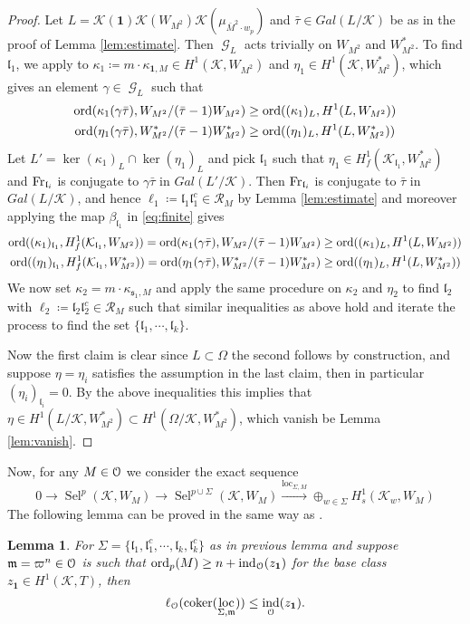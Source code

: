 \documentclass[leqno]{amsart}
\newtheorem{lem}[thm]{Lemma}
\theoremstyle{definition}
\theoremstyle{remark}
\newcommand{\id}{\mathbf{1}}
\newcommand{\eo}{\EuScript{O}}
\DeclareMathOperator{\coker}{coker}
\DeclareMathOperator{\ind}{ind} %
\DeclareMathOperator{\Gal}{\mathcal{G}}
\newcommand{\Fr}{\textnormal{Fr}} %
\newcommand{\fl}{\mathfrak{l}}
\newcommand{\fm}{\mathfrak{m}}
\newcommand{\fs}{\mathfrak{s}}
\newcommand{\K}{{\mathcal{K}}} %
\newcommand{\ord}{\textnormal{ord}} %
\DeclareMathOperator{\loc}{loc}
\DeclareMathOperator{\Sel}{Sel}
\begin{document}
\begin{proof}
Let $L=\K(\id)\K(W_{M^2})\K(\mu_{\bar{M}^2\cdot w_p})$
and $\bar{\tau}\in Gal(L/\K)$ be as in the proof of Lemma \ref{lem:estimate}.
Then $\Gal_L$ acts trivially on $W_{M^2}$ and $W_{M^2}^*$.
To find $\fl_1$, we apply \cite[Lem 5.2.1]{Rubin}
to $\kappa_1\coloneqq m\cdot \kappa_{\id,M}\in H^1(\K,W_{M^2})$ and
$\eta_{1}\in H^1(\K,W_{M^2}^*)$, which gives 
an element $\gamma\in \Gal_L$ such that 
\begin{align*}
	\ord(\kappa_1(\gamma\bar{\tau}),W_{M^2}/(\bar{\tau}-1)W_{M^2})&\geq
	\ord( (\kappa_1)_L, H^1(L,W_{M^2}) )\\
	\ord(\eta_1(\gamma\bar{\tau}),W_{M^2}^*/(\bar{\tau}-1)W_{M^2}^*)&\geq
	\ord( (\eta_1)_L, H^1(L,W_{M^2}^*) ) 
\end{align*}
Let $L'=\ker(\kappa_1)_L\cap \ker(\eta_1)_L$
and pick $\fl_1$ such that 
$\eta_1\in H^1_f(\K_{\fl_1}, W_{M^2}^*)$ and
$\Fr_{\fl_i}$ is conjugate to 
$\gamma\bar{\tau}$ in $Gal(L'/\K)$.
Then  $\Fr_{\fl_i}$ is conjugate to 
$\bar{\tau}$ in $Gal(L/\K)$,
and hence $\ell_1\coloneqq \fl_1\fl_1^c\in \mathcal{R}_M$ 
by Lemma \ref{lem:estimate}
and moreover applying the map $\beta_{\fl_1}$ in \eqref{eq:finite} gives
\begin{align*}
	\ord( (\kappa_1)_{\fl_1}, H^1_f(\K_{\fl_1},W_{M^2}))=
	\ord(\kappa_1(\gamma\bar{\tau}),W_{M^2}/(\bar{\tau}-1)W_{M^2})&\geq
	\ord( (\kappa_1)_L, H^1(L,W_{M^2}) )\\
	\ord( (\eta_1)_{\fl_1}, H^1_f(\K_{\fl_1},W_{M^2}^*))=
	\ord(\eta_1(\gamma\bar{\tau}),W_{M^2}^*/(\bar{\tau}-1)W_{M^2}^*)&\geq
	\ord( (\eta_1)_L, H^1(L,W_{M^2}^*) ) 
\end{align*}
We now set $\kappa_2=m\cdot \kappa_{\fs_1,M}$
and apply the same procedure on $\kappa_2$ and $\eta_2$
to find $\fl_2$ with
$\ell_2\coloneqq \fl_2\fl_2^c\in \mathcal{R}_M$ 
such that similar inequalities as above hold
and iterate the process to find 
the set $\{\fl_1,\cdots,\fl_k\}$.

Now the first claim is clear since $L\subset \Omega$
the second follows by construction,
and suppose $\eta=\eta_i$ satisfies
the assumption in the last claim,
then in particular $(\eta_i)_{\fl_i}=0$.
By the above inequalities this implies that
$\eta\in H^1(L/\K, W_{M^2}^*)\subset H^1(\Omega/\K, W_{M^2}^*)$,
which vanish be Lemma \ref{lem:vanish}.

\end{proof}


Now, for any $M\in \eo$ we consider the exact sequence
\[
    0\to \Sel^{p}(\K, W_M)\to
    \Sel^{p\cup \Sigma}(\K, W_M)\xrightarrow{\loc_{\Sigma,M}}
    \oplus_{w\in \Sigma}
    H^1_s(\K_w, W_M)
\]
The following lemma can be proved 
in the same way as \cite[Lem 5.2.5]{Rubin}.
\begin{lem}
For $\Sigma=\{\fl_1,\fl_1^c,\cdots, \fl_k,\fl_k^c\}$
as in previous lemma
and suppose $\fm=\varpi^n\in \eo$
is such that $\ord_p(M)\geq n+\ind_{\eo}(z_{\id})$
for the base class $z_{\id}\in H^1(\K,T)$, then 
\[
    \ell_{\eo}(\coker(\loc_{\Sigma,\fm}))\leq 
    \ind_{\eo}(z_\id).
\]
\end{lem}
\end{document}
